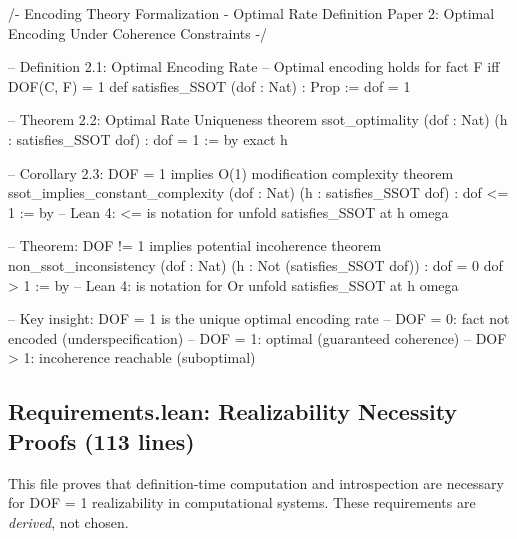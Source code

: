 \begin{code}
/-
  Encoding Theory Formalization - Optimal Rate Definition
  Paper 2: Optimal Encoding Under Coherence Constraints
-/

-- Definition 2.1: Optimal Encoding Rate
-- Optimal encoding holds for fact F iff DOF(C, F) = 1
def satisfies_SSOT (dof : Nat) : Prop := dof = 1

-- Theorem 2.2: Optimal Rate Uniqueness
theorem ssot_optimality (dof : Nat) (h : satisfies_SSOT dof) :
    dof = 1 := by
  exact h

-- Corollary 2.3: DOF = 1 implies O(1) modification complexity
theorem ssot_implies_constant_complexity (dof : Nat) (h : satisfies_SSOT dof) :
    dof <= 1 := by  -- Lean 4: <= is notation for \leq
  unfold satisfies_SSOT at h
  omega

-- Theorem: DOF != 1 implies potential incoherence
theorem non_ssot_inconsistency (dof : Nat) (h : Not (satisfies_SSOT dof)) :
    dof = 0 \/ dof > 1 := by  -- Lean 4: \/ is notation for Or
  unfold satisfies_SSOT at h
  omega

-- Key insight: DOF = 1 is the unique optimal encoding rate
-- DOF = 0: fact not encoded (underspecification)
-- DOF = 1: optimal (guaranteed coherence)
-- DOF > 1: incoherence reachable (suboptimal)
\end{code}

\subsection{Requirements.lean: Realizability Necessity Proofs (113 lines)}\label{sec:lean-requirements}

This file proves that definition-time computation and introspection are necessary for DOF = 1 realizability in computational systems. These requirements are \emph{derived}, not chosen.

